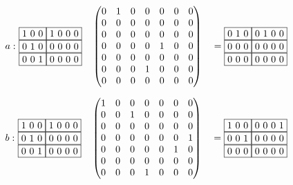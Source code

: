 \begin{example}
\begin{alignat*}{7}
  a:\,\,
  & \begin{matrix}
    \fbox{1 0 0} \fbox{1 0 0 0} \\ 
    \fbox{0 1 0} \fbox{0 0 0 0} \\
    \fbox{0 0 1} \fbox{0 0 0 0}
      \end{matrix}  && \begin{pmatrix}
      0 & 1 & 0 & 0 & 0 & 0 & 0 \\
      0 & 0 & 0 & 0 & 0 & 0 & 0 \\
      0 & 0 & 0 & 0 & 0 & 0 & 0 \\
      0 & 0 & 0 & 0 & 1 & 0 & 0 \\
      0 & 0 & 0 & 0 & 0 & 0 & 0 \\
      0 & 0 & 0 & 1 & 0 & 0 & 0 \\
      0 & 0 & 0 & 0 & 0 & 0 & 0  
      \end{pmatrix} &&= \begin{matrix}
        \fbox{0 1 0} \fbox{0 1 0 0} \\ 
        \fbox{0 0 0} \fbox{0 0 0 0} \\
        \fbox{0 0 0} \fbox{0 0 0 0}
    \end{matrix}
\end{alignat*}
  
\begin{alignat*}{7}
  b:\,\,
  & \begin{matrix}
    \fbox{1 0 0} \fbox{1 0 0 0} \\ 
    \fbox{0 1 0} \fbox{0 0 0 0} \\
    \fbox{0 0 1} \fbox{0 0 0 0}
      \end{matrix}  && \begin{pmatrix}
      1 & 0 & 0 & 0 & 0 & 0 & 0 \\
      0 & 0 & 1 & 0 & 0 & 0 & 0 \\
      0 & 0 & 0 & 0 & 0 & 0 & 0 \\
      0 & 0 & 0 & 0 & 0 & 0 & 1 \\
      0 & 0 & 0 & 0 & 0 & 1 & 0 \\
      0 & 0 & 0 & 0 & 0 & 0 & 0 \\
      0 & 0 & 0 & 1 & 0 & 0 & 0
      \end{pmatrix} &&= \begin{matrix}
        \fbox{1 0 0} \fbox{0 0 0 1} \\ 
        \fbox{0 0 1} \fbox{0 0 0 0} \\
        \fbox{0 0 0} \fbox{0 0 0 0}
    \end{matrix}
\end{alignat*}


\end{example}
